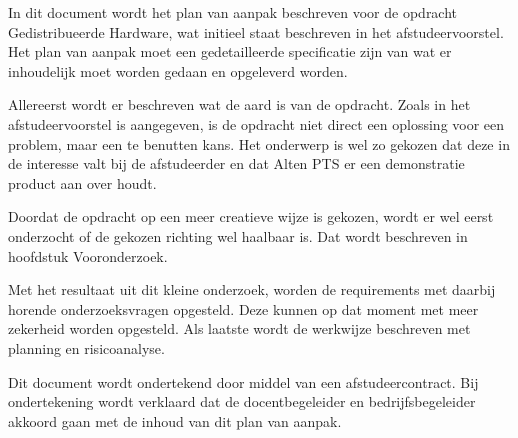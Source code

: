 \documentclass{../local}
\begin{document}
In dit document wordt het plan van aanpak beschreven voor de opdracht Gedistribueerde Hardware, wat initieel staat beschreven in het afstudeervoorstel. Het plan van aanpak moet een gedetailleerde specificatie zijn van wat er inhoudelijk moet worden gedaan en opgeleverd worden.

Allereerst wordt er beschreven wat de aard is van de opdracht. Zoals in het afstudeervoorstel is aangegeven, is de opdracht niet direct een oplossing voor een problem, maar een te benutten kans. Het onderwerp is wel zo gekozen dat deze in de interesse valt bij de afstudeerder en dat Alten PTS er een demonstratie product aan over houdt. 

Doordat de opdracht op een meer creatieve wijze is gekozen, wordt er wel eerst onderzocht of de gekozen richting wel haalbaar is. Dat wordt beschreven in hoofdstuk Vooronderzoek.

Met het resultaat uit dit kleine onderzoek, worden de requirements met daarbij horende onderzoeksvragen opgesteld. Deze kunnen op dat moment met meer zekerheid worden opgesteld. Als laatste wordt de werkwijze beschreven met planning en risicoanalyse.

Dit document wordt ondertekend door middel van een afstudeercontract. Bij ondertekening wordt verklaard dat de docentbegeleider en bedrijfsbegeleider akkoord gaan met de inhoud van dit plan van aanpak.
\end{document}
